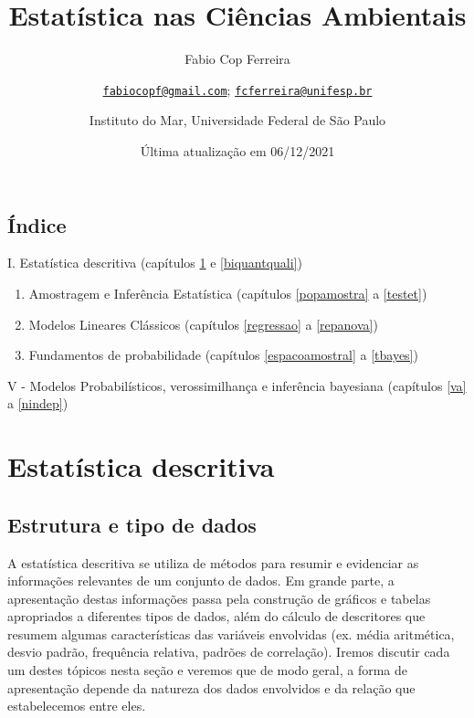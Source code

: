 \documentclass[
]{book}
\title{Estatística nas Ciências Ambientais}
\author{Fabio Cop Ferreira \and \href{mailto:fabiocopf@gmail.com}{\nolinkurl{fabiocopf@gmail.com}}; \href{mailto:fcferreira@unifesp.br}{\nolinkurl{fcferreira@unifesp.br}} \and Instituto do Mar, Universidade Federal de São Paulo}
\date{Última atualização em 06/12/2021}
\begin{document}
\maketitle

{
\setcounter{tocdepth}{1}
\tableofcontents
}
\hypertarget{uxedndice}{%
\chapter*{Índice}\label{uxedndice}}

I. Estatística descritiva (capítulos \ref{estrdados} e \ref{biquantquali})

\begin{enumerate}
\def\labelenumi{\Roman{enumi}.}
\setcounter{enumi}{1}
\item
  Amostragem e Inferência Estatística (capítulos \ref{popamostra} a \ref{testet})
\item
  Modelos Lineares Clássicos (capítulos \ref{regressao} a \ref{repanova})
\item
  Fundamentos de probabilidade (capítulos \ref{espacoamostral} a \ref{tbayes})
\end{enumerate}

V - Modelos Probabilísticos, verossimilhança e inferência bayesiana (capítulos \ref{va} a \ref{nindep})

\hypertarget{part-estatuxedstica-descritiva}{%
\part{Estatística descritiva}\label{part-estatuxedstica-descritiva}}

\hypertarget{estrdados}{%
\chapter{Estrutura e tipo de dados}\label{estrdados}}

A estatística descritiva se utiliza de métodos para resumir e evidenciar as informações relevantes de um conjunto de dados. Em grande parte, a apresentação destas informações passa pela construção de gráficos e tabelas apropriados a diferentes tipos de dados, além do cálculo de descritores que resumem algumas características das variáveis envolvidas (ex. média aritmética, desvio padrão, frequência relativa, padrões de correlação). Iremos discutir cada um destes tópicos nesta seção e veremos que de modo geral, a forma de apresentação depende da natureza dos dados envolvidos e da relação que estabelecemos entre eles.
\end{document}
